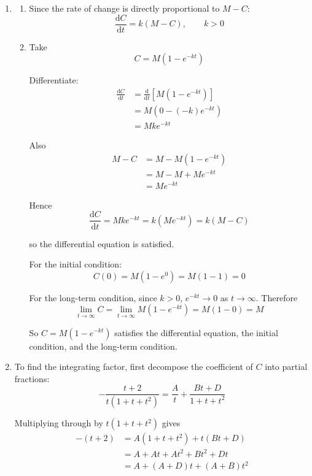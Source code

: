 \documentclass[leqno]{article}
\begin{document}
\begin{enumerate}[
  label=\textbf{\arabic*.},
  leftmargin=*,
  topsep=0pt,
  partopsep=0pt,
  parsep=0pt
]
\vspace*{10pt}

\begin{djsSolution}
\begin{enumerate}[label=\textbf{(\alph*)}]
  \item
  \begin{enumerate}[label=(\roman*)]
    \item Since the rate of change is directly proportional to $M-C$:
    \[
    \frac{\mathrm{d}C}{\mathrm{d}t}=k(M-C), \qquad k>0
    \]

    \item Take
    \[
    C=M(1-e^{-kt})
    \]

    Differentiate:
    \begin{align*}
    \frac{\mathrm{d}C}{\mathrm{d}t}
    &= \frac{\mathrm{d}}{\mathrm{d}t}\left[M(1-e^{-kt})\right] \\
    &= M\left(0-(-k)e^{-kt}\right) \\
    &= Mke^{-kt}
    \end{align*}

    Also
    \begin{align*}
    M-C
    &= M-M(1-e^{-kt}) \\
    &= M-M+Me^{-kt} \\
    &= Me^{-kt}
    \end{align*}

    Hence
    \[
    \frac{\mathrm{d}C}{\mathrm{d}t}=Mke^{-kt}=k(Me^{-kt})=k(M-C)
    \]

    so the differential equation is satisfied.

    For the initial condition:
    \[
    C(0)=M(1-e^{0})=M(1-1)=0
    \]

    For the long-term condition, since $k>0$, $e^{-kt}\to 0$ as $t\to\infty$. Therefore
    \[
    \lim_{t\to\infty} C = \lim_{t\to\infty} M(1-e^{-kt}) = M(1-0)=M
    \]

    So $C=M(1-e^{-kt})$ satisfies the differential equation, the initial condition, and the long-term condition.
  \end{enumerate}

  \item To find the integrating factor, first decompose the coefficient of $C$ into partial fractions:
  \[
  -\frac{t+2}{t(1+t+t^2)}=\frac{A}{t}+\frac{Bt+D}{1+t+t^2}
  \]

  Multiplying through by $t(1+t+t^2)$ gives
  \begin{align*}
  -(t+2)
  &= A(1+t+t^2)+t(Bt+D) \\
  &= A+At+At^2+Bt^2+Dt \\
  &= A+(A+D)t+(A+B)t^2
  \end{align*}


\end{enumerate}
\end{djsSolution}
\end{enumerate}
\end{document}

